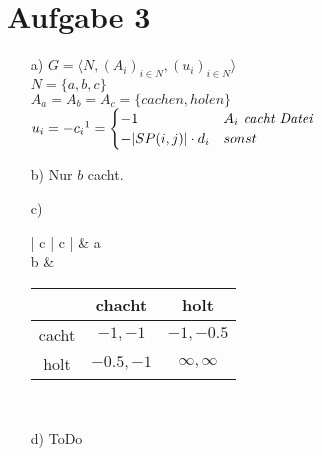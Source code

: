\documentclass{article}
\begin{document}
\section*{Aufgabe 3}
	\begin{enumerate}
		\item [a)]
			$G = \langle N, (A_i)_{i \in N}, (u_i)_{i \in N} \rangle$ \\
			$N = \{ a, b, c \}$\\
			$A_a = A_b = A_c = \{ \mathit{cachen}, \mathit{holen}\}$\\
			
			$u_i = - c_i \footnote{Da die Kosten minimiert werden sollen.} = 
				\begin{cases}
					- 1 & \textit{$A_i$ cacht Datei}\\
					- |SP(i,j)| \cdot d_i & sonst
				\end{cases}
			$
		\item [b)]
			Nur $b$ cacht.
		\item [c)]
			\begin{tabular}{| c | c |} \hline
				 & a \\ \hline
				b & \begin{tabular}{ c | c | c} 
						& chacht & holt \\ \hline
						cacht & $-1, -1$ & $-1, -0.5$  \\ \hline
						holt & $-0.5, -1$ & $\infty, \infty$ \\ 
					\end{tabular} \\ \hline   
			\end{tabular}
		\item [d)] ToDo
	\end{enumerate}
\end{document}
